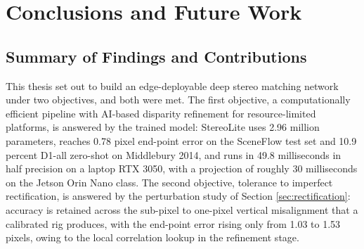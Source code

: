\chapter{Conclusions and Future Work}

\section{Summary of Findings and Contributions}
This thesis set out to build an edge-deployable deep stereo matching
network under two objectives, and both were met. The first objective, a
computationally efficient pipeline with AI-based disparity refinement for
resource-limited platforms, is answered by the trained model: StereoLite
uses 2.96 million parameters, reaches 0.78 pixel end-point error on the
SceneFlow test set and 10.9 percent D1-all zero-shot on Middlebury 2014,
and runs in 49.8 milliseconds in half precision on a laptop RTX 3050, with
a projection of roughly 30 milliseconds on the Jetson Orin Nano class.
The second objective, tolerance to imperfect rectification, is answered by
the perturbation study of Section \ref{sec:rectification}: accuracy is
retained across the sub-pixel to one-pixel vertical misalignment that a
calibrated rig produces, with the end-point error rising only from 1.03 to
1.53 pixels, owing to the local correlation lookup in the refinement
stage.


